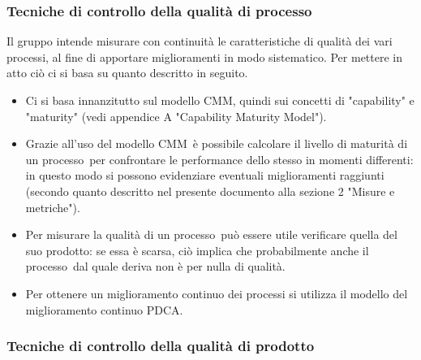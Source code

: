 \documentclass[../PianoDiQualifica.tex]{subfiles}
\begin{document}
			\subsubsection{Tecniche di controllo della qualità di processo}
			Il gruppo intende misurare con continuità le caratteristiche di qualità dei vari processi, al fine di apportare miglioramenti in modo sistematico. Per mettere in atto ciò ci si basa su quanto descritto in seguito.
			\begin{itemize}
				\item Ci si basa innanzitutto sul modello CMM\g, quindi sui concetti di "capability" e "maturity" (vedi appendice A "Capability Maturity Model").
				\item Grazie all'uso del modello CMM\g\ è possibile calcolare il livello di maturità di un processo\g\ per confrontare le performance dello stesso in momenti differenti: in questo modo si possono evidenziare eventuali miglioramenti raggiunti (secondo quanto descritto nel presente documento alla sezione 2 "Misure e metriche").
				\item Per misurare la qualità di un processo\g\ può essere utile verificare quella del suo prodotto\g: se essa è scarsa, ciò implica che probabilmente anche il processo\g\ 
dal quale deriva non è per nulla di qualità.
				\item Per ottenere un miglioramento continuo dei processi si utilizza il modello del miglioramento continuo PDCA\g.
			\end{itemize}
			\subsubsection{Tecniche di controllo della qualità di prodotto}
\end{document}
